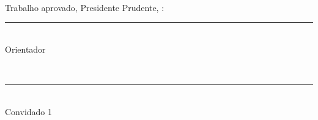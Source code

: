 \newpage
\thispagestyle{empty}

\begin{center}
    \titulo\\
    \vspace{3cm}
    Trabalho aprovado, Presidente Prudente, \the\year{}:
\end{center}

\vspace{3cm}

\begin{center}
    \begin{minipage}{8cm}
        \begin{center}
            \hrule
            \vspace{0.5cm}
            \textbf{\orientador}\\
            Orientador
        \end{center}
\end{minipage}
\\
\vspace{3.5cm}

\begin{minipage}{8cm}
    \begin{center}
        \hrule
        \vspace{0.5cm}
        \textbf{\professorconvidado}\\
        Convidado 1
    \end{center}
\end{minipage}
\\
\vspace*{\fill}
\begin{center}
    \uppercase{\cidade\\\the\year{}}
\end{center}
\end{center}

